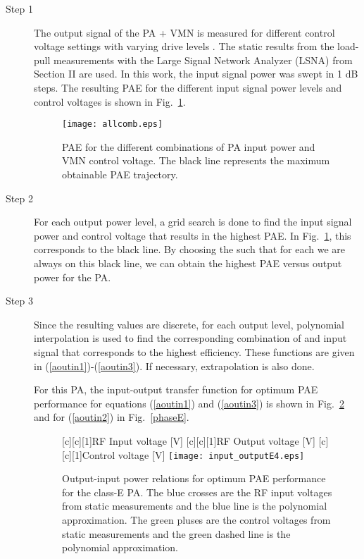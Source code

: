 \documentclass[10pt,journal]{IEEEtran}
\begin{document}
\begin{description}
\item[Step 1] The output signal  of the PA + VMN is measured for different control voltage settings  with varying drive levels . The static results from the load-pull measurements with the Large Signal Network Analyzer (LSNA) from Section II are used. In this work, the input signal power was swept in 1 dB steps. The resulting PAE for the different input signal power levels and control voltages is shown in Fig.~\ref{allcomb}.

\begin{figure}
\centering
\texttt{[image: allcomb.eps]}
\caption{PAE for the different combinations of PA input power and VMN control voltage. The black line represents the maximum obtainable PAE trajectory.}
\label{allcomb}
\end{figure}

\item[Step 2] For each output power level, a grid search is done to find the input signal power and control voltage that results in the highest PAE. In Fig.~\ref{allcomb}, this corresponds to the black line. By choosing the  such that for each  we are always on this black line, we can obtain the highest PAE versus output power for the PA.

\item[Step 3] Since the resulting values are discrete, for each output level, polynomial interpolation is used to find the corresponding combination of  and input signal that corresponds to the highest efficiency. These functions are given in (\ref{aoutin1})-(\ref{aoutin3}). If necessary, extrapolation is also done.
    

    For this PA, the input-output transfer function for optimum PAE performance for equations (\ref{aoutin1}) and (\ref{aoutin3}) is shown in Fig.~\ref{out-inE} and for (\ref{aoutin2}) in Fig.~\ref{phaseE}.

    \begin{figure}
    \centering
    [c][c][1]{RF Input voltage  [V]} [c][c][1]{RF Output voltage  [V]} [c][c][1]{Control voltage  [V]}
    \texttt{[image: input\_outputE4.eps]}
    \caption{Output-input power relations for optimum PAE performance for the class-E PA. The blue crosses are the RF input voltages from static measurements and the blue line is the polynomial approximation. The green pluses are the control voltages from static measurements and the green dashed line is the polynomial approximation.}
    \label{out-inE}
    \end{figure}



\end{description}
\end{document}
